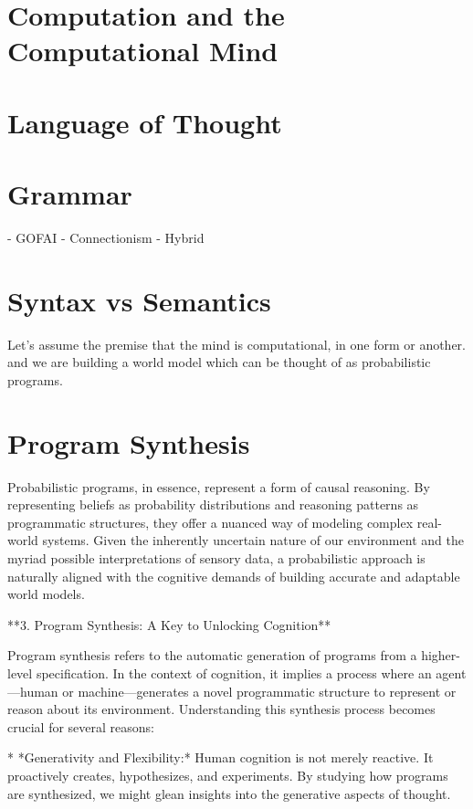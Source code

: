 


\section{Computation and the Computational Mind}
\section{Language of Thought}
\section{Grammar}
- GOFAI
- Connectionism
- Hybrid
\section{Syntax vs Semantics}



Let's assume the premise that the mind is computational, in one form or another. 
and we are building a world model which can be thought of as probabilistic programs. 

\section{Program Synthesis}

Probabilistic programs, in essence, represent a form of causal reasoning. By representing beliefs as probability distributions and reasoning patterns as programmatic structures, they offer a nuanced way of modeling complex real-world systems. Given the inherently uncertain nature of our environment and the myriad possible interpretations of sensory data, a probabilistic approach is naturally aligned with the cognitive demands of building accurate and adaptable world models.

**3. Program Synthesis: A Key to Unlocking Cognition**

Program synthesis refers to the automatic generation of programs from a higher-level specification. In the context of cognition, it implies a process where an agent—human or machine—generates a novel programmatic structure to represent or reason about its environment. Understanding this synthesis process becomes crucial for several reasons:

* *Generativity and Flexibility:* Human cognition is not merely reactive. It proactively creates, hypothesizes, and experiments. By studying how programs are synthesized, we might glean insights into the generative aspects of thought.

